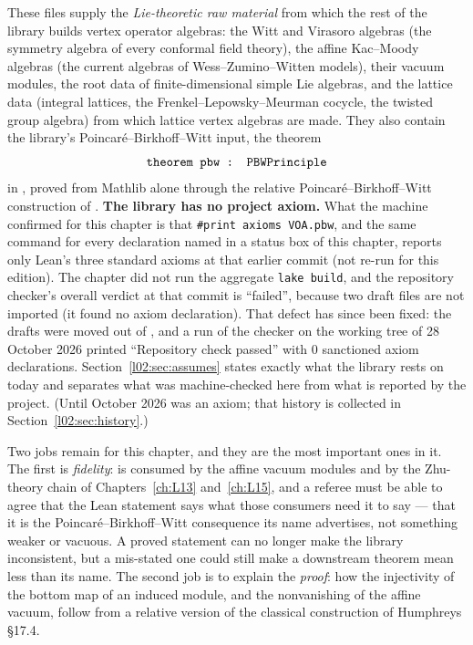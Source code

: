 These files supply the \emph{Lie-theoretic raw material} from which the rest of the library builds
vertex operator algebras: the Witt and Virasoro algebras (the symmetry algebra of every conformal
field theory), the affine Kac--Moody algebras (the current algebras of Wess--Zumino--Witten
models), their vacuum modules, the root data of finite-dimensional simple Lie algebras, and the
lattice data (integral lattices, the Frenkel--Lepowsky--Meurman cocycle, the twisted group
algebra) from which lattice vertex algebras are made. They also contain the library's
Poincar\'e--Birkhoff--Witt input, the theorem
\begin{equation*}
 \lean{theorem pbw : PBWPrinciple}
\end{equation*}
in , proved from Mathlib alone through the
relative Poincar\'e--Birkhoff--Witt construction of .
\textbf{The library has no project axiom.} What the machine confirmed for this chapter is that
\texttt{\#print axioms VOA.pbw}, and the same command for every declaration named in a status box of
this chapter, reports only Lean's three standard axioms at that earlier commit (not re-run for this edition). The chapter did
not run the aggregate \texttt{lake build}, and the repository checker's overall verdict at that
commit is ``failed'', because two draft files are not imported (it found no axiom declaration). That
defect has since been fixed: the drafts were moved out of , and a run of the checker on the
working tree of 28 October 2026 printed ``Repository check passed'' with 0 sanctioned axiom declarations.
Section~\ref{l02:sec:assumes} states exactly what the library rests on today and separates what was
machine-checked here from what is reported by the project. (Until October 2026  was an
axiom; that history is collected in Section~\ref{l02:sec:history}.)

Two jobs remain for this chapter, and they are the most important ones in it. The first is
\emph{fidelity}:  is consumed by the affine vacuum modules and by the Zhu-theory
chain of Chapters~\ref{ch:L13} and~\ref{ch:L15}, and a referee must be able to agree that the Lean
statement  says what those consumers need it to say --- that it is the
Poincar\'e--Birkhoff--Witt consequence its name advertises, not something weaker or vacuous. A
proved statement can no longer make the library inconsistent, but a mis-stated one could still make
a downstream theorem mean less than its name. The second job is to explain the \emph{proof}: how
the injectivity of the bottom map of an induced module, and the nonvanishing of the affine vacuum,
follow from a relative version of the classical construction of Humphreys \S17.4.

